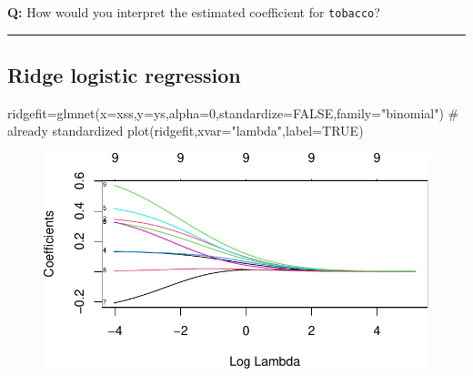 \documentclass[
  letterpaper,
  DIV=11,
  numbers=noendperiod]{scrartcl}
\newenvironment{Shaded}{\begin{snugshade}}{\end{snugshade}}
\newcommand{\AttributeTok}[1]{\textcolor[rgb]{0.40,0.45,0.13}{#1}}
\newcommand{\CommentTok}[1]{\textcolor[rgb]{0.37,0.37,0.37}{#1}}
\newcommand{\ConstantTok}[1]{\textcolor[rgb]{0.56,0.35,0.01}{#1}}
\newcommand{\DecValTok}[1]{\textcolor[rgb]{0.68,0.00,0.00}{#1}}
\newcommand{\FunctionTok}[1]{\textcolor[rgb]{0.28,0.35,0.67}{#1}}
\newcommand{\NormalTok}[1]{\textcolor[rgb]{0.00,0.23,0.31}{#1}}
\newcommand{\OtherTok}[1]{\textcolor[rgb]{0.00,0.23,0.31}{#1}}
\newcommand{\SpecialCharTok}[1]{\textcolor[rgb]{0.37,0.37,0.37}{#1}}
\newcommand{\StringTok}[1]{\textcolor[rgb]{0.13,0.47,0.30}{#1}}
\begin{document}
\textbf{Q:} How would you interpret the estimated coefficient for
\texttt{tobacco}?

\begin{center}\rule{0.5\linewidth}{0.5pt}\end{center}

\hypertarget{ridge-logistic-regression}{%
\subsection{Ridge logistic regression}\label{ridge-logistic-regression}}

\begin{Shaded}
\begin{Highlighting}[]
\NormalTok{ridgefit}\OtherTok{=}\FunctionTok{glmnet}\NormalTok{(}\AttributeTok{x=}\NormalTok{xss,}\AttributeTok{y=}\NormalTok{ys,}\AttributeTok{alpha=}\DecValTok{0}\NormalTok{,}\AttributeTok{standardize=}\ConstantTok{FALSE}\NormalTok{,}\AttributeTok{family=}\StringTok{"binomial"}\NormalTok{) }\CommentTok{\# already standardized}
\FunctionTok{plot}\NormalTok{(ridgefit,}\AttributeTok{xvar=}\StringTok{"lambda"}\NormalTok{,}\AttributeTok{label=}\ConstantTok{TRUE}\NormalTok{)}
\end{Highlighting}
\end{Shaded}

\begin{figure}[H]

{\centering \includegraphics{L10_files/figure-pdf/unnamed-chunk-8-1.pdf}

}

\end{figure}

\begin{Shaded}
\end{Shaded}
\end{document}
